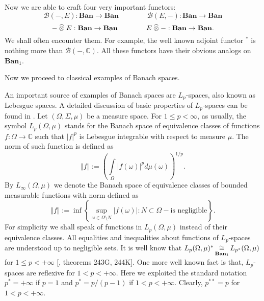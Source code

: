 Now we are able to craft four very important functors:
$$
\mathcal{B}(-,E):\mathbf{Ban}\to\mathbf{Ban}
\qquad\qquad
\mathcal{B}(E,-):\mathbf{Ban}\to\mathbf{Ban}
$$
$$
-\mathbin{\widehat{\otimes}} E:\mathbf{Ban}\to\mathbf{Ban}
\qquad\qquad
E\mathbin{\widehat{\otimes}} -:\mathbf{Ban}\to\mathbf{Ban}.
$$
We shall often encounter them. For example, the well known adjoint functor ${}^*$ is nothing more than $\mathcal{B}(-,\mathbb{C})$. All these functors have their obvious analogs on $\mathbf{Ban}_1$.

Now we  proceed to classical examples of Banach spaces. 

An important source of examples of Banach spaces are $L_p$-spaces, also known as Lebesgue spaces. A detailed discussion of basic properties of $L_p$-spaces can be found in \cite{CarothShortCourseBanSp}.  Let $(\Omega,\Sigma,\mu)$ be a measure space.  For $1\leq p<\infty$, as usually, the symbol $L_p(\Omega,\mu)$ stands for the Banach space of equivalence classes of functions $f:\Omega\to\mathbb{C}$ such that $|f|^p$ is Lebesgue integrable with respect to measure $\mu$. The norm of such function is defined as
$$
\Vert f\Vert:=\left(\int\limits_{\Omega}|f(\omega)|^pd\mu(\omega)\right)^{1/p}.
$$ 
By $L_\infty(\Omega,\mu)$ we denote the Banach space of equivalence classes of bounded measurable functions with norm defined as 
$$
\Vert f\Vert:=\inf\left\{\sup_{\omega\in\Omega\setminus N}|f(\omega)|:N\subset\Omega - \mbox{is negligible}\right\}.
$$
For simplicity we shall speak of functions in $L_p(\Omega,\mu)$ instead of their equivalence classes. All equalities and inequalities about functions of $L_p$-spaces are understood up to negligible sets. It is well know that $L_p(\Omega,\mu)^*\mathop{\mathbin{\cong}}\limits_{\mathbf{Ban}_1}L_{p^*}(\Omega,\mu)$ for $1\leq p<+\infty$ [\cite{FremMeasTh}, theorems 243G, 244K]. One more well known fact is that, $L_p$-spaces are reflexive for $1<p<+\infty$. Here we exploited the standard notation $p^*=+\infty$ if $p=1$ and $p^*=p/(p-1)$ if $1<p<+\infty$. Clearly, $p^{**}=p$ for $1<p<+\infty$.

